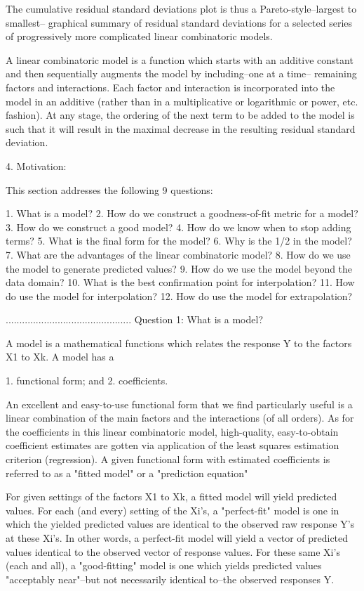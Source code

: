 The cumulative residual standard deviations plot
is thus a Pareto-style--largest to smallest--
graphical summary of residual standard deviations
for a selected series of progressively more
complicated linear combinatoric models.

A linear combinatoric model is a function which starts
with an additive constant and then sequentially
augments the model by including--one at a time--
remaining factors and interactions.  Each factor and
interaction is incorporated into the model in an
additive (rather than in a multiplicative or
logarithmic or power, etc. fashion).  At any stage, the
ordering of the next term to be added to the model is
such that it will result in the maximal decrease in the
resulting residual standard deviation.

4. Motivation:

This section addresses the following 9 questions:

   1. What is a model?
   2. How do we construct a goodness-of-fit metric for a model?
   3. How do we construct a good model?
   4. How do we know when to stop adding terms?
   5. What is the final form for the model?
   6. Why is the 1/2 in the model?
   7. What are the advantages of the linear combinatoric model?
   8. How do we use the model to generate predicted values?
   9. How do we use the model beyond the data domain?
  10. What is the best confirmation point for interpolation?
  11. How do use the model for interpolation?
  12. How do use the model for extrapolation?

..............................................
Question 1: What is a model?

A model is a mathematical functions which relates
the response Y to the factors X1 to Xk.  A model
has a

   1. functional form; and
   2. coefficients.

An excellent and easy-to-use functional form that
we find particularly useful is a linear
combination of the main factors and the
interactions (of all orders).  As for the
coefficients in this linear combinatoric model,
high-quality, easy-to-obtain coefficient estimates
are gotten via application of the least squares
estimation criterion (regression).  A given
functional form with estimated coefficients is
referred to as a "fitted model" or a "prediction
equation"

For given settings of the factors X1 to Xk, a
fitted model will yield predicted values.  For
each (and every) setting of the Xi's, a
"perfect-fit" model is one in which the yielded
predicted values are identical to the observed raw
response Y's at these Xi's.  In other words, a
perfect-fit model will yield a vector of predicted
values identical to the observed vector of
response values.  For these same Xi's (each and
all), a "good-fitting" model is one which yields
predicted values "acceptably near"--but not
necessarily identical to--the observed responses Y.

